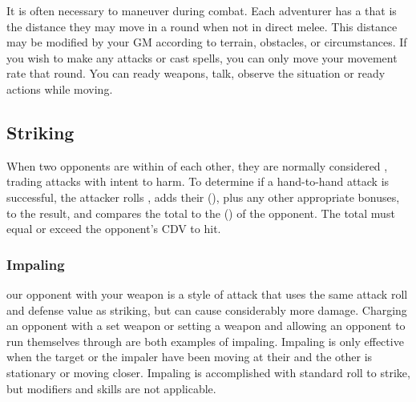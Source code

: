 \begin{multicols}{2}
It is often necessary to maneuver during combat. Each adventurer has a  that is the distance they may move in a round when not in direct melee. This distance may be modified by your GM according to terrain, obstacles, or circumstances. If you wish to make any attacks or cast spells, you can only move  your movement rate that round. You can ready weapons, talk, observe the situation or ready actions while moving.

\subsection{Striking}
When two opponents are within  of each other, they are normally considered , trading attacks with intent to harm. To determine if a hand-to-hand attack is successful, the attacker rolls , adds their  (\CM), plus any other appropriate bonuses, to the result, and compares the total to the  (\CDV) of the opponent. The total must equal or exceed the opponent's CDV to hit.


\subsubsection{Impaling}
 our opponent with your weapon is a style of attack that uses the same attack roll and defense value as striking, but can cause considerably more damage. Charging an opponent with a set weapon or setting a weapon and allowing an opponent to run themselves through are both examples of impaling. Impaling is only effective when the target or the impaler have been moving at their  and the other is stationary or moving closer. Impaling is accomplished with  standard roll to strike, but modifiers and skills are not applicable.

\end{multicols}
